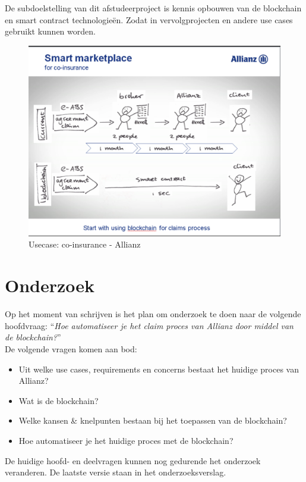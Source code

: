 De subdoelstelling van dit afstudeerproject is kennis opbouwen van de blockchain en smart contract technologieën. Zodat in vervolgprojecten en andere use cases gebruikt kunnen worden. 

\begin{figure}[h!]
    \begin{center}
        \includegraphics[scale=0.5]{images/allianz-blockchain}
        \caption{Usecase: co-insurance - Allianz}
        \label{fig:allianz-blockchain}
    \end{center}
\end{figure}

\newpage
\section{Onderzoek}
Op het moment van schrijven is het plan om onderzoek te doen naar de volgende hoofdvraag: ``\textit{Hoe automatiseer je het claim proces van Allianz door middel van de blockchain?}''\\
De volgende vragen komen aan bod:
\begin{itemize}
  \item Uit welke use cases, requirements en concerns bestaat het huidige proces van Allianz?
  \item Wat is de blockchain?
  \item Welke kansen \& knelpunten bestaan bij het toepassen van de blockchain?
  \item Hoe automatiseer je het huidige proces met de blockchain?
\end{itemize}
De huidige hoofd- en deelvragen kunnen nog gedurende het onderzoek veranderen. De laatste versie staan in het onderzoeksverslag.